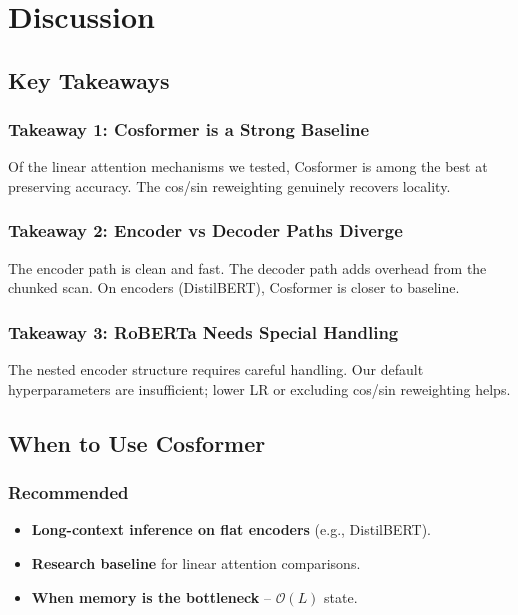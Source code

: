 
\section{Discussion}

\subsection{Key Takeaways}

\subsubsection{Takeaway 1: Cosformer is a Strong Baseline}

Of the linear attention mechanisms we tested, Cosformer is among the best 
at preserving accuracy. The cos/sin reweighting genuinely recovers locality.

\subsubsection{Takeaway 2: Encoder vs Decoder Paths Diverge}

The encoder path is clean and fast. The decoder path adds overhead from 
the chunked scan. On encoders (DistilBERT), Cosformer is closer to baseline.

\subsubsection{Takeaway 3: RoBERTa Needs Special Handling}

The nested encoder structure requires careful handling. Our default 
hyperparameters are insufficient; lower LR or excluding cos/sin reweighting 
helps.

\subsection{When to Use Cosformer}

\subsubsection{Recommended}

\begin{itemize}
\item \textbf{Long-context inference on flat encoders} (e.g., DistilBERT).
\item \textbf{Research baseline} for linear attention comparisons.
\item \textbf{When memory is the bottleneck} -- $\mathcal{O}(L)$ state.

\end{itemize}
